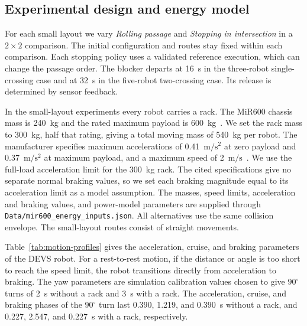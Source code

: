 \documentclass[11pt,a4paper]{article}
\begin{document}
\subsection{Experimental design and energy model}
\label{sec:energy-model}
For each small layout we vary \emph{Rolling passage} and \emph{Stopping in intersection} in a $2\times2$ comparison. The initial configuration and routes stay
fixed within each comparison. Each stopping policy uses a validated reference
execution, which can change the passage order. The blocker departs at 16~s
in the three-robot single-crossing case and at 32~s in the five-robot
two-crossing case. Its release is determined by sensor feedback.

In the small-layout experiments every robot carries a rack. The MiR600 chassis
mass is 240~kg and the rated maximum
payload is 600~kg~\cite{mir600}. We set the rack mass to 300~kg, half that
rating, giving a total moving mass of 540~kg per robot. The manufacturer
specifies maximum accelerations of 0.41~$\mathrm{m/s^2}$ at zero payload and
0.37~$\mathrm{m/s^2}$ at maximum payload, and a maximum speed of
2~$\mathrm{m/s}$~\cite{mir600datasheet}. We use the full-load acceleration
limit for the 300~kg rack. The cited specifications give no separate normal
braking values, so we set each braking magnitude equal to its acceleration
limit as a model assumption. The masses, speed limits, acceleration and
braking values, and power-model parameters are supplied through
\nolinkurl{Data/mir600_energy_inputs.json}. All alternatives use the same
collision envelope. The small-layout routes consist of straight movements.

Table~\ref{tab:motion-profiles} gives the acceleration, cruise, and braking
parameters of the DEVS robot. For a rest-to-rest motion, if the
distance or angle is too short to reach the speed limit, the robot transitions
directly from acceleration to braking. The yaw parameters are simulation
calibration values chosen to give $90^\circ$ turns of 2~s without a rack
and 3~s with a rack. The acceleration, cruise, and braking phases of the
$90^\circ$ turn last 0.390, 1.219, and 0.390~s without a rack, and 0.227,
2.547, and 0.227~s with a rack, respectively.
\end{document}
